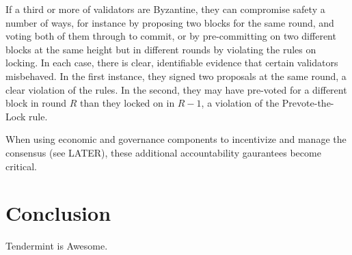 If a third or more of validators are Byzantine, they can compromise safety a number of ways, 
for instance by proposing two blocks for the same round, and voting both of them through to commit, 
or by pre-committing on two different blocks at the same height but in different rounds by violating the rules on locking.
In each case, there is clear, identifiable evidence that certain validators misbehaved. 
In the first instance, they signed two proposals at the same round, a clear violation of the rules.
In the second, they may have pre-voted for a different block in round $R$ than they locked on in $R-1$, 
a violation of the Prevote-the-Lock rule.

When using economic and governance components to incentivize and manage the consensus (see LATER), 
these additional accountability gaurantees become critical.

\section{Conclusion}

Tendermint is Awesome.



